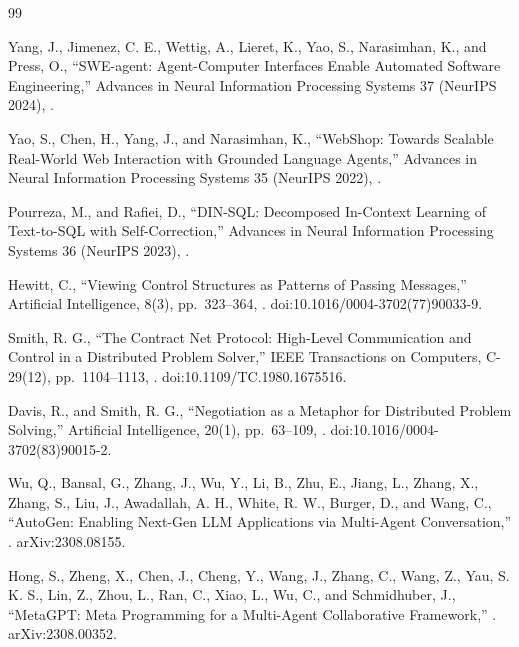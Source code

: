 \documentclass[11pt,a4paper]{article}
\begin{document}
\newcommand{\bibspace}[0]{\vspace*{0.1cm}}
\begin{thebibliography}{99}

Yang, J., Jimenez, C. E., Wettig, A., Lieret, K., Yao, S., Narasimhan, K., and Press, O.,
\newblock ``{SWE-agent: Agent-Computer Interfaces Enable Automated Software Engineering},''
\newblock Advances in Neural Information Processing Systems 37 (NeurIPS 2024),
.

\bibspace
{}
Yao, S., Chen, H., Yang, J., and Narasimhan, K.,
\newblock ``{WebShop: Towards Scalable Real-World Web Interaction with Grounded Language Agents},''
\newblock Advances in Neural Information Processing Systems 35 (NeurIPS 2022),
.

\bibspace
{}
Pourreza, M., and Rafiei, D.,
\newblock ``{DIN-SQL: Decomposed In-Context Learning of Text-to-SQL with Self-Correction},''
\newblock Advances in Neural Information Processing Systems 36 (NeurIPS 2023),
.

\bibspace
{}
Hewitt, C.,
\newblock ``{Viewing Control Structures as Patterns of Passing Messages},''
\newblock Artificial Intelligence, 8(3), pp.~323--364,
.
\newblock doi:10.1016/0004-3702(77)90033-9.

\bibspace
{}
Smith, R. G.,
\newblock ``{The Contract Net Protocol: High-Level Communication and Control in a Distributed Problem Solver},''
\newblock IEEE Transactions on Computers, C-29(12), pp.~1104--1113,
.
\newblock doi:10.1109/TC.1980.1675516.

\bibspace
{}
Davis, R., and Smith, R. G.,
\newblock ``{Negotiation as a Metaphor for Distributed Problem Solving},''
\newblock Artificial Intelligence, 20(1), pp.~63--109,
.
\newblock doi:10.1016/0004-3702(83)90015-2.

\bibspace
{}
Wu, Q., Bansal, G., Zhang, J., Wu, Y., Li, B., Zhu, E., Jiang, L., Zhang, X., Zhang, S., Liu, J., Awadallah, A. H., White, R. W., Burger, D., and Wang, C.,
\newblock ``{AutoGen: Enabling Next-Gen LLM Applications via Multi-Agent Conversation},''
.
\newblock arXiv:2308.08155.

\bibspace
{}
Hong, S., Zheng, X., Chen, J., Cheng, Y., Wang, J., Zhang, C., Wang, Z., Yau, S. K. S., Lin, Z., Zhou, L., Ran, C., Xiao, L., Wu, C., and Schmidhuber, J.,
\newblock ``{MetaGPT: Meta Programming for a Multi-Agent Collaborative Framework},''
.
\newblock arXiv:2308.00352.


\end{thebibliography}
\end{document}
